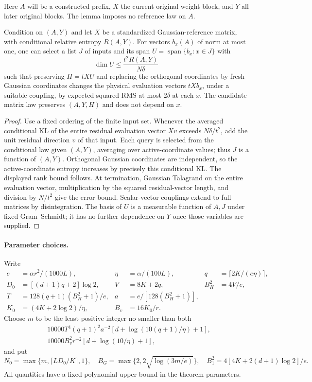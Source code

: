 Here $A$ will be a constructed prefix, $X$ the current original weight block,
and $Y$ all later original blocks. The lemma imposes no reference law on $A$.

\begin{lemma}
\label{lem:block-entropy}
Condition on $(A,Y)$ and let $X$ be a standardized Gaussian-reference matrix,
with conditional relative entropy $R(A,Y)$. For vectors $b_x(A)$ of norm at
most one, one can select a list $J$ of inputs and its span
$U=\operatorname{span}\{b_x:x\in J\}$ with
\[
 \dim U\le\frac{t^2R(A,Y)}{N\delta}
\]
such that preserving $H=tXU$ and replacing the orthogonal coordinates by fresh
Gaussian coordinates changes the physical evaluation vectors $tXb_x$, under
a suitable coupling, by expected squared RMS at most $2\delta$ at each $x$.
The candidate matrix law preserves $(A,Y,H)$ and does not depend on $x$.
\end{lemma}
\begin{proof}
Use a fixed ordering of the finite input set. Whenever the averaged conditional
KL of the entire residual evaluation vector $Xv$ exceeds $N\delta/t^2$, add
the unit residual direction $v$ of that input. Each query is selected from
the conditional law given $(A,Y)$, averaging over active-coordinate values;
thus $J$ is a function of $(A,Y)$. Orthogonal Gaussian coordinates
are independent, so the active-coordinate entropy increases by precisely this
conditional KL. The displayed rank bound follows. At termination, Gaussian
Talagrand on the entire evaluation vector, multiplication by the squared
residual-vector length, and division by $N/t^2$ give the error bound.
Scalar-vector couplings extend to full matrices by disintegration.
The basis of $U$ is a measurable function of $A,J$ under fixed Gram--Schmidt;
it has no further dependence on $Y$ once those variables are supplied.
\end{proof}

\paragraph{Parameter choices.}
Write
\begin{align*}
 e&=\alpha r^2/(1000L),& \eta&=\alpha/(100L),&
 q&=\lceil2K/(e\eta)\rceil,\\
 D_0&=[(d+1)q+2]\log2,& V&=8K+2q,& B_H^2&=4V/e,\\
 T&=128(q+1)(B_H^2+1)/e,& a&=e/[128(B_H^2+1)],\\
 K_0&=(4K+2\log2)/\eta,& B_v&=16K_0/r.
\end{align*}
Choose $m$ to be the least positive integer no smaller than both
\begin{align*}
 &10000T^4(q+1)^2a^{-2}[d+\log(10(q+1)/\eta)+1],\\
 &10000B_v^2r^{-2}[d+\log(10/\eta)+1],
\end{align*}
and put
\[
 N_0=\max\{m,\lceil LD_0/K\rceil,1\},\quad
 B_G=\max\{2,2\sqrt{\log(3m/e)}\},\quad
 B_1^2=4[4K+2(d+1)\log2]/e.
\]
All quantities have a fixed polynomial upper bound in the theorem parameters.


